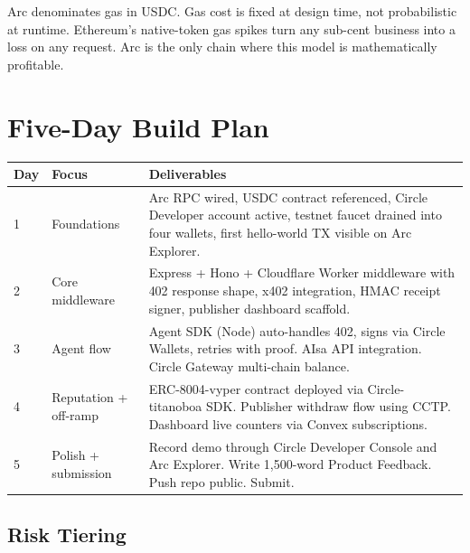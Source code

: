 \documentclass[11pt,a4paper]{article}
\newcommand{\iconCheck}{\textcolor{tollgategreen}{\faCheckCircle}}
\begin{document}
\begin{highlightbox}[title={\iconCheck~ Why Arc wins this math}]
Arc denominates gas in USDC. Gas cost is fixed at design time, not probabilistic at runtime. Ethereum's native-token gas spikes turn any sub-cent business into a loss on any request. Arc is the only chain where this model is mathematically profitable.
\end{highlightbox}

\newpage

\section{Five-Day Build Plan}

\begin{table}[H]
\centering
\footnotesize
\begin{tabularx}{\textwidth}{@{} l l X @{}}
\toprule
\textbf{Day} & \textbf{Focus} & \textbf{Deliverables} \\
\midrule
1 & Foundations & Arc RPC wired, USDC contract referenced, Circle Developer account active, testnet faucet drained into four wallets, first hello-world TX visible on Arc Explorer. \\
2 & Core middleware & Express + Hono + Cloudflare Worker middleware with 402 response shape, x402 integration, HMAC receipt signer, publisher dashboard scaffold. \\
3 & Agent flow & Agent SDK (Node) auto-handles 402, signs via Circle Wallets, retries with proof. AIsa API integration. Circle Gateway multi-chain balance. \\
4 & Reputation + off-ramp & ERC-8004-vyper contract deployed via Circle-titanoboa SDK. Publisher withdraw flow using CCTP. Dashboard live counters via Convex subscriptions. \\
5 & Polish + submission & Record demo through Circle Developer Console and Arc Explorer. Write 1,500-word Product Feedback. Push repo public. Submit. \\
\bottomrule
\end{tabularx}
\end{table}

\subsection{Risk Tiering}
\end{document}
